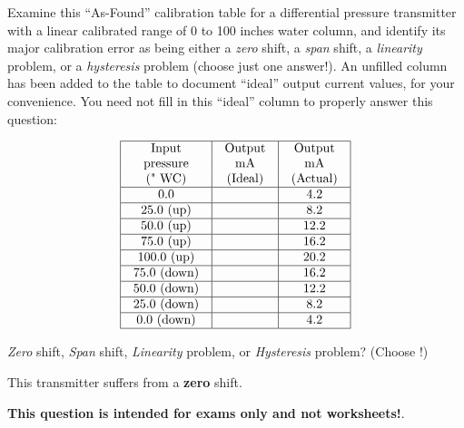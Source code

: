 

Examine this ``As-Found'' calibration table for a differential pressure transmitter with a linear calibrated range of 0 to 100 inches water column, and identify its major calibration error as being either a {\it zero} shift, a {\it span} shift, a {\it linearity} problem, or a {\it hysteresis} problem (choose just one answer!).  An unfilled column has been added to the table to document ``ideal'' output current values, for your convenience.  You need not fill in this ``ideal'' column to properly answer this question:


$$\vbox{\offinterlineskip
\halign{\strut
\vrule \quad\hfil # \ \hfil & 
\vrule \quad\hfil # \ \hfil & 
\vrule \quad\hfil # \ \hfil \vrule \cr
\noalign{\hrule}
%
Input & Output & Output \cr
%
pressure & mA & mA \cr
%
(" WC) & (Ideal) & (Actual) \cr
%
\noalign{\hrule}
%
0.0 & & 4.2 \cr
%
\noalign{\hrule}
%
25.0 (up) & & 8.2 \cr
%
\noalign{\hrule}
%
50.0 (up) & & 12.2 \cr
%
\noalign{\hrule}
%
75.0 (up) & & 16.2 \cr
%
\noalign{\hrule}
%
100.0 (up) & & 20.2 \cr
%
\noalign{\hrule}
%
75.0 (down) & & 16.2 \cr
%
\noalign{\hrule}
%
50.0 (down) & & 12.2 \cr
%
\noalign{\hrule}
%
25.0 (down) & & 8.2 \cr
%
\noalign{\hrule}
%
0.0 (down) & & 4.2 \cr
%
\noalign{\hrule}
} %
}$$ %

{\it Zero} shift, {\it Span} shift, {\it Linearity} problem, or {\it Hysteresis} problem?  (Choose !)







This transmitter suffers from a {\bf zero} shift.







{\bf This question is intended for exams only and not worksheets!}.


